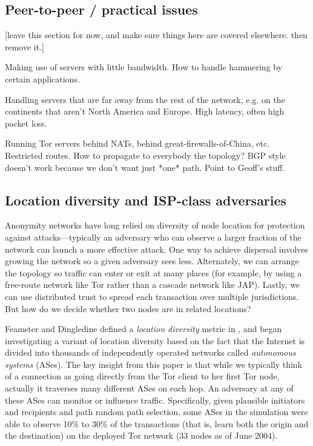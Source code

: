 \documentclass{llncs}
\begin{document}
\subsection{Peer-to-peer / practical issues}

[leave this section for now, and make sure things here are covered
elsewhere. then remove it.]

Making use of servers with little bandwidth. How to handle hammering by
certain applications.

Handling servers that are far away from the rest of the network, e.g. on
the continents that aren't North America and Europe. High latency,
often high packet loss.

Running Tor servers behind NATs, behind great-firewalls-of-China, etc.
Restricted routes. How to propagate to everybody the topology? BGP
style doesn't work because we don't want just *one* path. Point to
Geoff's stuff.

\subsection{Location diversity and ISP-class adversaries}
\label{subsec:routing-zones}

Anonymity networks have long relied on diversity of node location for
protection against attacks---typically an adversary who can observe a
larger fraction of the network can launch a more effective attack. One
way to achieve dispersal involves growing the network so a given adversary
sees less. Alternately, we can arrange the topology so traffic can enter
or exit at many places (for example, by using a free-route network
like Tor rather than a cascade network like JAP). Lastly, we can use
distributed trust to spread each transaction over multiple jurisdictions.
But how do we decide whether two nodes are in related locations?

Feamster and Dingledine defined a \emph{location diversity} metric
in \cite{feamster:wpes2004}, and began investigating a variant of location
diversity based on the fact that the Internet is divided into thousands of
independently operated networks called {\em autonomous systems} (ASes).
The key insight from this paper is that while we typically think of a
connection as going directly from the Tor client to her first Tor node,
actually it traverses many different ASes on each hop. An adversary at
any of these ASes can monitor or influence traffic. Specifically, given
plausible initiators and recipients and path random path selection,
some ASes in the simulation were able to observe 10\% to 30\% of the
transactions (that is, learn both the origin and the destination) on
the deployed Tor network (33 nodes as of June 2004).
\end{document}
